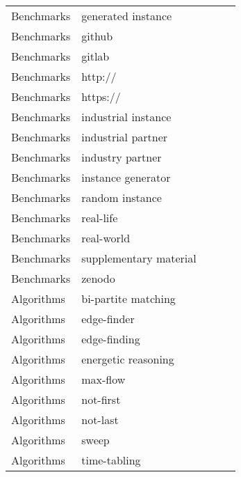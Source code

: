 {\begin{longtable}{lp{3cm}>{\raggedright}p{6cm}>{\raggedright}p{6cm}p{8cm}}
Benchmarks & generated instance &  &  & \\
Benchmarks & github &  &  & \\
Benchmarks & gitlab &  &  & \\
Benchmarks & http:// &  &  & \\
Benchmarks & https:// &  &  & \\
Benchmarks & industrial instance &  &  & \\
Benchmarks & industrial partner &  &  & \\
Benchmarks & industry partner &  &  & \\
Benchmarks & instance generator &  &  & \\
Benchmarks & random instance &  &  & \\
Benchmarks & real-life &  &  & \\
Benchmarks & real-world &  &  & \\
Benchmarks & supplementary material &  &  & \\
Benchmarks & zenodo &  &  & \\
Algorithms & bi-partite matching &  &  & \\
Algorithms & edge-finder &  &  & \\
Algorithms & edge-finding &  &  & \\
Algorithms & energetic reasoning &  &  & \\
Algorithms & max-flow &  &  & \\
Algorithms & not-first &  &  & \\
Algorithms & not-last &  &  & \\
Algorithms & sweep &  &  & \\
Algorithms & time-tabling &  &  & \\
\end{longtable}
}

